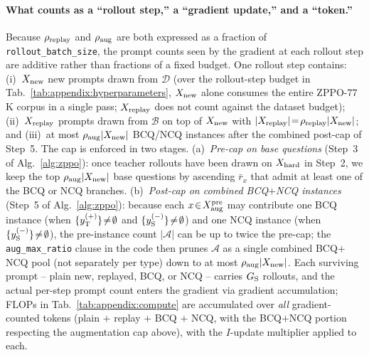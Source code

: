 \paragraph{What counts as a ``rollout step,'' a ``gradient update,'' and a ``token.''} Because $\rho_{\rm replay}$ and $\rho_{\rm aug}$ are both expressed as a fraction of \texttt{rollout\_batch\_size}, the prompt counts seen by the gradient at each rollout step are additive rather than fractions of a fixed budget. One rollout step contains: (i)~$X_{\rm new}$ new prompts drawn from $\mathcal{D}$ (over the rollout-step budget in Tab.~\ref{tab:appendix:hyperparameters}, $X_{\rm new}$ alone consumes the entire ZPPO-$77$K corpus in a single pass; $X_{\rm replay}$ does not count against the dataset budget); (ii)~$X_{\rm replay}$ prompts drawn from $\mathcal{B}$ on top of $X_{\rm new}$ with $|X_{\rm replay}|\!=\!\rho_{\rm replay}|X_{\rm new}|$; and (iii)~at most $\rho_{\rm aug}|X_{\rm new}|$ BCQ/NCQ instances after the combined post-cap of Step~5. The cap is enforced in two stages. (a)~\emph{Pre-cap on base questions} (Step~3 of Alg.~\ref{alg:zppo}): once teacher rollouts have been drawn on $X_{\rm hard}$ in Step~2, we keep the top $\rho_{\rm aug}|X_{\rm new}|$ base questions by ascending $\bar{r}_x$ that admit at least one of the BCQ or NCQ branches. (b)~\emph{Post-cap on combined BCQ$+$NCQ instances} (Step~5 of Alg.~\ref{alg:zppo}): because each $x\!\in\!X_{\rm aug}^{\rm pre}$ may contribute one BCQ instance (when $\{y_{\rm T}^{(+)}\}\!\neq\!\emptyset$ and $\{y_{\rm S}^{(-)}\}\!\neq\!\emptyset$) and one NCQ instance (when $\{y_{\rm S}^{(-)}\}\!\neq\!\emptyset$), the pre-instance count $|\mathcal{A}|$ can be up to twice the pre-cap; the \texttt{aug\_max\_ratio} clause in the code then prunes $\mathcal{A}$ as a single combined BCQ$+$NCQ pool (not separately per type) down to at most $\rho_{\rm aug}|X_{\rm new}|$. Each surviving prompt -- plain new, replayed, BCQ, or NCQ -- carries $G_{\rm S}$ rollouts, and the actual per-step prompt count enters the gradient via gradient accumulation; FLOPs in Tab.~\ref{tab:appendix:compute} are accumulated over \emph{all} gradient-counted tokens (plain $+$ replay $+$ BCQ $+$ NCQ, with the BCQ$+$NCQ portion respecting the augmentation cap above), with the $I$-update multiplier applied to each.

